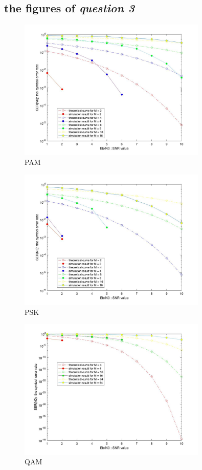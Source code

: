 \documentclass{article}
\begin{document}
\begin{CJK*}{UTF8}{bsmi}
\subsection{the figures of \emph{question 3}}
    \begin{figure}[!htb]
    \centering
    \includegraphics[width=0.8\textwidth]{PAM.jpg}
    \caption{\label{fig:PAM.jpg} PAM}
    \end{figure}
    \begin{figure}[!htb]
    \centering
    \includegraphics[width=0.8\textwidth]{PSK.jpg}
    \caption{\label{fig:PSK.jpg} PSK}
    \end{figure}
    \begin{figure}[!htb]
    \centering
    \includegraphics[width=0.8\textwidth]{QAM.jpg}
    \caption{\label{fig:QAM.jpg} QAM}
    \end{figure}
\pagebreak

\end{CJK*}
\end{document}
